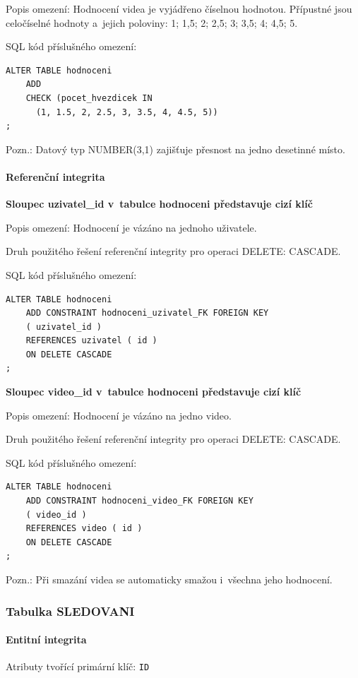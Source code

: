 \documentclass[12pt,a4paper]{article}
\begin{document}
Popis omezení: Hodnocení videa je vyjádřeno číselnou hodnotou. Přípustné jsou celočíselné
hodnoty a~jejich poloviny: 1; 1,5; 2; 2,5; 3; 3,5; 4; 4,5; 5.

SQL kód příslušného omezení:
\begin{lstlisting}
ALTER TABLE hodnoceni
    ADD
    CHECK (pocet_hvezdicek IN
      (1, 1.5, 2, 2.5, 3, 3.5, 4, 4.5, 5))
;
\end{lstlisting}
Pozn.: Datový typ NUMBER(3,1) zajišťuje přesnost na jedno desetinné místo.

\paragraph{Referenční integrita}

\textbf{Sloupec uzivatel\_id v~tabulce hodnoceni představuje cizí klíč}

Popis omezení: Hodnocení je vázáno na jednoho uživatele.

Druh použitého řešení referenční integrity pro operaci DELETE: CASCADE.

SQL kód příslušného omezení:
\begin{lstlisting}
ALTER TABLE hodnoceni
    ADD CONSTRAINT hodnoceni_uzivatel_FK FOREIGN KEY
    ( uzivatel_id )
    REFERENCES uzivatel ( id )
    ON DELETE CASCADE
;
\end{lstlisting}

\textbf{Sloupec video\_id v~tabulce hodnoceni představuje cizí klíč}

Popis omezení: Hodnocení je vázáno na jedno video.

Druh použitého řešení referenční integrity pro operaci DELETE: CASCADE.

SQL kód příslušného omezení:
\begin{lstlisting}
ALTER TABLE hodnoceni
    ADD CONSTRAINT hodnoceni_video_FK FOREIGN KEY
    ( video_id )
    REFERENCES video ( id )
    ON DELETE CASCADE
;
\end{lstlisting}
Pozn.: Při smazání videa se automaticky smažou i~všechna jeho hodnocení.

\subsubsection{Tabulka SLEDOVANI}

\paragraph{Entitní integrita}
Atributy tvořící primární klíč: \texttt{ID}
\end{document}
